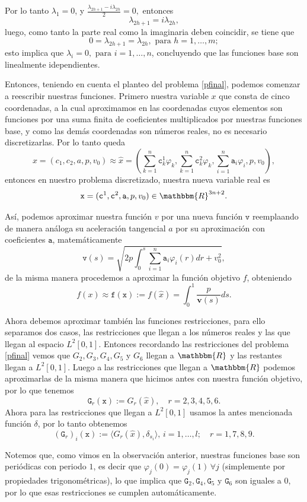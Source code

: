 \documentclass[a4paper,10pt]{book}
\newcommand{\R}{\mathbbm{R}}
\begin{document}
Por lo tanto $\lambda_1=0$, y $\frac{\lambda_{2h+1}-i\lambda_{2h}}{2}=0,$ entonces $$\lambda_{2h+1}=i\lambda_{2h},$$
luego, como tanto la parte real como la imaginaria deben coincidir, se tiene que $$0=\lambda_{2h+1}=\lambda_{2h},\mbox{ para }h=1,\ldots,m;$$
esto implica que $\lambda_i=0, \mbox{ para }i=1,\ldots,n$, concluyendo que las funciones base son linealmente idependientes.




Entonces, teniendo en cuenta el planteo del problema \eqref{pfinal}, podemos comenzar a reescribir nuestras funciones. Primero nuestra variable $x$ que consta de cinco coordenadas, a la cual aproximamos en las coordenadas cuyos elementos son funciones por una suma finita de coeficientes multiplicados por nuestras funciones base, y como las demás coordenadas son números reales, no es necesario discretizarlas. Por lo tanto queda $$x=(c_1,c_2,a,p,v_0)\approx\hat{x}=\left(\sum_{k=1}^n\texttt{c}^1_k\varphi_k, \sum_{k=1}^n\texttt{c}^2_k\varphi_k,\sum_{i=1}^n\texttt{a}_i\varphi_i, p, v_0\right),$$
entonces en nuestro problema discretizado, nuestra nueva variable real es $$\texttt{x}=(\texttt{c}^1,\texttt{c}^2,\texttt{a},p,v_0)\in\R^{3n+2}.$$

Así, podemos aproximar nuestra función $v$ por una nueva función $\texttt{v}$ reemplaando de manera análoga su aceleración tangencial $a$ por su aproximación con coeficientes $\texttt{a}$, matemáticamente $$\texttt{v}(s)=\sqrt{2p\int_0^s \sum_{i=1}^n\texttt{a}_i\varphi_i(r)dr +v_0^2},$$
de la misma manera procedemos a aproximar la función objetivo $f$, obteniendo $$f(x)\approx\texttt{f}(\texttt{x}):=f(\hat x)=\int_0^1 \frac{p}{\textbf{v}(s)}ds.$$

Ahora debemos aproximar también las funciones restricciones, para ello separamos dos casos, las restricciones que llegan a los números reales y las que llegan al espacio $L^2[0,1]$. Entonces recordando las restricciones del problema \eqref{pfinal} vemos que $G_2, G_3, G_4, G_5$ y $G_6$ llegan a $\R$ y las restantes llegan a $L^2[0,1]$. Luego a las restricciones que llegan a $\R$ podemos aproximarlas de la misma manera que hicimos antes con nuestra función objetivo, por lo que tenemos $$\texttt{G}_r(\texttt{x}):=G_r(\hat x),\quad r=2,3,4,5,6.$$
Ahora para las restricciones que llegan a $L^2[0,1]$ usamos la antes mencionada función $\delta$, por lo tanto obtenemos $$(\texttt{G}_r)_{i}(\texttt{x}):=\langle G_r(\hat x) , \delta_{s_i}\rangle,\,i=1,\ldots,l; \quad r=1,7,8,9.$$

Notemos que, como vimos en la observación anterior, nuestras funciones base son periódicas con periodo $1$, es decir que $\varphi_j(0)=\varphi_j(1)\, \forall j$ (simplemente por propiedades trigonométricas), lo que implica que $\texttt{G}_2,\texttt{G}_4,\texttt{G}_5\mbox{ y }\texttt{G}_6$ son iguales a 0, por lo que esas restricciones se cumplen automáticamente.
\end{document}
